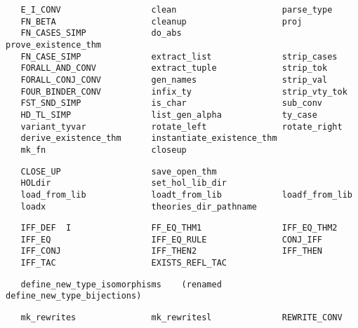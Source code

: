 \begin{hol}\begin{verbatim}
   E_I_CONV                  clean                     parse_type
   FN_BETA                   cleanup                   proj
   FN_CASES_SIMP             do_abs                    prove_existence_thm
   FN_CASE_SIMP              extract_list              strip_cases
   FORALL_AND_CONV           extract_tuple             strip_tok
   FORALL_CONJ_CONV          gen_names                 strip_val
   FOUR_BINDER_CONV          infix_ty                  strip_vty_tok
   FST_SND_SIMP              is_char                   sub_conv
   HD_TL_SIMP                list_gen_alpha            ty_case
   variant_tyvar             rotate_left               rotate_right
   derive_existence_thm      instantiate_existence_thm
   mk_fn                     closeup   
\end{verbatim}\end{hol}
\begin{hol}\begin{verbatim}
   CLOSE_UP                  save_open_thm
   HOLdir                    set_hol_lib_dir
   load_from_lib             loadt_from_lib            loadf_from_lib
   loadx                     theories_dir_pathname
\end{verbatim}\end{hol}
\begin{hol}\begin{verbatim}
   IFF_DEF  I                FF_EQ_THM1                IFF_EQ_THM2  
   IFF_EQ                    IFF_EQ_RULE               CONJ_IFF
   IFF_CONJ                  IFF_THEN2                 IFF_THEN  
   IFF_TAC                   EXISTS_REFL_TAC
\end{verbatim}\end{hol}
\begin{hol}\begin{verbatim}
   define_new_type_isomorphisms    (renamed define_new_type_bijections)
\end{verbatim}\end{hol}
\begin{hol}\begin{verbatim}
   mk_rewrites               mk_rewritesl              REWRITE_CONV
\end{verbatim}\end{hol}


